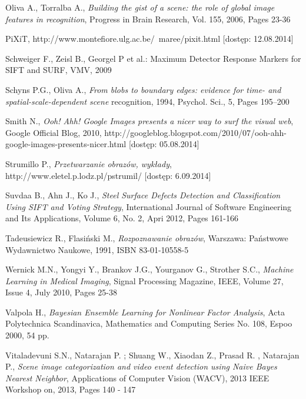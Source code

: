 \begin{thebibliography}{100}
 Oliva A., Torralba A., \emph{Building the gist of a scene: the role of global image features in recognition}, Progress in Brain Research, Vol. 155, 2006, Pages 23-36

 PiXiT, http://www.montefiore.ulg.ac.be/~maree/pixit.html [dostęp: 12.08.2014]

 Schweiger F., Zeisl B., Georgel P et al.: Maximum Detector Response Markers for SIFT and SURF, VMV, 
2009

 Schyns P.G., Oliva A., \emph{From blobs to boundary edges: evidence for time- and spatial-scale-dependent scene} recognition, 1994, Psychol. Sci., 5, Pages 195–200

 Smith N., \emph{Ooh! Ahh! Google Images presents a nicer way to surf the visual web}, Google Official Blog, 2010, http://googleblog.blogspot.com/2010/07/ooh-ahh-google-images-presents-nicer.html [dostęp: 05.08.2014]

 Strumillo P., \emph{Przetwarzanie obrazów, wykłady}, http://www.eletel.p.lodz.pl/pstrumil/ [dostęp: 6.09.2014]

 Suvdaa B., Ahn J., Ko J., \emph{Steel Surface Defects Detection and Classification Using SIFT and Voting Strategy}, International Journal of Software Engineering and Its Applications, Volume 6, No. 2, Apri 2012, Pages 161-166

 Tadeusiewicz R., Flasiński M., \emph{Rozpoznawanie obrazów}, Warszawa: Państwowe Wydawnictwo Naukowe, 1991, ISBN 83-01-10558-5

 Wernick M.N., Yongyi Y., Brankov J.G., Yourganov G., Strother S.C., \emph{Machine Learning in Medical Imaging}, Signal Processing Magazine, IEEE, Volume 27,  Issue 4, July 2010, Pages 25-38

 Valpola H., \emph{Bayesian Ensemble Learning for Nonlinear Factor Analysis}, Acta Polytechnica Scandinavica, Mathematics and Computing Series No. 108, Espoo 2000, 54 pp.

 Vitaladevuni S.N., Natarajan P. ; Shuang W., Xiaodan Z., Prasad R. , Natarajan P., \emph{Scene image categorization and video event detection using Naive Bayes Nearest Neighbor}, Applications of Computer Vision (WACV), 2013 IEEE Workshop on, 2013, Pages 140 - 147
 
\end{thebibliography} 